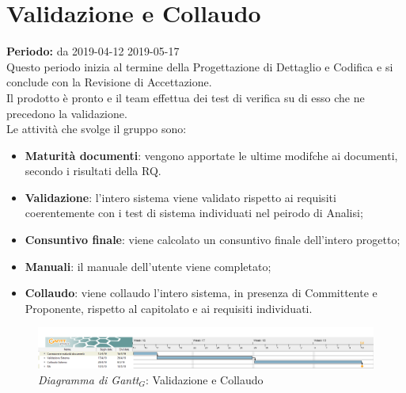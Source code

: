 \section{Validazione e Collaudo}
\textbf{Periodo:} da 2019-04-12 2019-05-17\\
Questo periodo inizia al termine della Progettazione di Dettaglio e Codifica e si conclude con la Revisione di Accettazione.\\
Il prodotto è pronto e il team effettua dei test di verifica su di esso che ne precedono la validazione.\\
Le attività che svolge il gruppo sono:
\begin{itemize}
   \item \textbf{Maturità documenti}: vengono apportate le ultime modifche ai documenti, secondo i risultati della RQ.
   \item \textbf{Validazione}: l'intero sistema viene validato rispetto ai requisiti coerentemente con i test di sistema individuati nel peirodo di Analisi;
   \item \textbf{Consuntivo finale}: viene calcolato un consuntivo finale dell'intero progetto;
   \item \textbf{Manuali}: il manuale dell'utente viene completato;
   \item \textbf{Collaudo}: viene collaudo l'intero sistema, in presenza di Committente e Proponente, rispetto al capitolato e ai requisiti individuati. 
\end{itemize}
\begin{figure} [h]
    \centering
    \includegraphics[scale=0.29]{./images/ZeroSevenGanttVerifica.png}
    \caption{\textit{Diagramma di Gantt$_{G}$}: Validazione e Collaudo }\label{}
\end{figure}